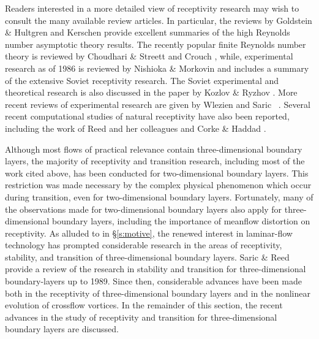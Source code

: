 Readers interested in a more detailed view of receptivity research may wish to
consult the many available review articles.  In particular, the reviews by
Goldstein \& Hultgren \cite{GoHu:89} and Kerschen \cite{Kerschen:89} provide
excellent summaries of the high Reynolds number asymptotic theory results.
The recently popular finite Reynolds number theory is reviewed by Choudhari \&
Streett \cite{ChSt:94} and Crouch \cite{Crouch:94}, while, experimental
research as of 1986 is reviewed by Nishioka \& Morkovin \cite{NiMo:86} and
includes a summary of the extensive Soviet receptivity research.  The Soviet
experimental and theoretical research is also discussed in the paper by Kozlov
\& Ryzhov \cite{KoRy:90}.  More recent reviews of experimental research are
given by Wlezien \cite{Wlezien:94} and Saric \etal\ \cite{SaWeRa:95}.  Several
recent computational studies of natural receptivity have also been reported,
including the work of Reed and her colleagues \cite{SaReKe:94} and Corke \&
Haddad \cite{CoHa:95}.

Although most flows of practical relevance contain three-dimensional boundary
layers, the majority of receptivity and transition research, including most of
the work cited above, has been conducted for two-dimensional boundary layers.
This restriction was made necessary by the complex physical phenomenon which
occur during transition, even for two-dimensional boundary layers.
Fortunately, many of the observations made for two-dimensional boundary layers
also apply for three-dimensional boundary layers, including the importance of
meanflow distortion on receptivity.  As alluded to in \S\ref{s:motive}, the
renewed interest in laminar-flow technology has prompted considerable research
in the areas of receptivity, stability, and transition of three-dimensional
boundary layers.  Saric \& Reed \cite{SaRe:89} provide a review of the
research in stability and transition for three-dimensional boundary-layers up
to 1989.  Since then, considerable advances have been made both in the
receptivity of three-dimensional boundary layers and in the nonlinear
evolution of crossflow vortices.  In the remainder of this section, the recent
advances in the study of receptivity and transition for three-dimensional
boundary layers are discussed.

